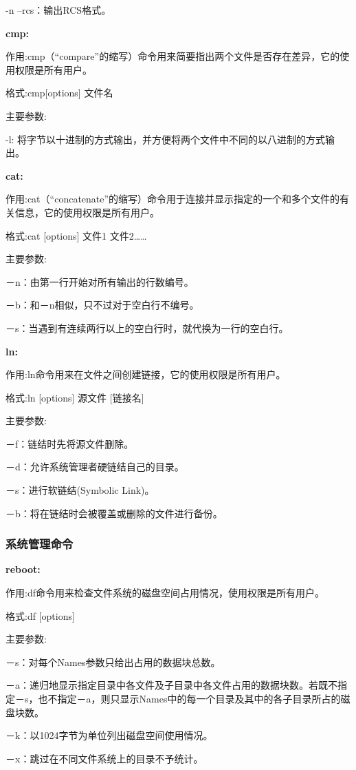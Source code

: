 -n --rcs：输出RCS格式。

\textbf{cmp:}

作用:cmp（“compare”的缩写）命令用来简要指出两个文件是否存在差异，它的使用权限是所有用户。

格式:cmp[options] 文件名

主要参数:

-l: 将字节以十进制的方式输出，并方便将两个文件中不同的以八进制的方式输出。

\textbf{cat:}

作用:cat（“concatenate”的缩写）命令用于连接并显示指定的一个和多个文件的有关信息，它的使用权限是所有用户。

格式:cat [options] 文件1 文件2……

主要参数:

－n：由第一行开始对所有输出的行数编号。

－b：和－n相似，只不过对于空白行不编号。

－s：当遇到有连续两行以上的空白行时，就代换为一行的空白行。

\textbf{ln:}

作用:ln命令用来在文件之间创建链接，它的使用权限是所有用户。

格式:ln [options] 源文件 [链接名]

主要参数:

－f：链结时先将源文件删除。

－d：允许系统管理者硬链结自己的目录。

－s：进行软链结(Symbolic Link)。

－b：将在链结时会被覆盖或删除的文件进行备份。

\subsubsection{系统管理命令}

\textbf{reboot:}

作用:df命令用来检查文件系统的磁盘空间占用情况，使用权限是所有用户。

格式:df [options]

主要参数:

－s：对每个Names参数只给出占用的数据块总数。

－a：递归地显示指定目录中各文件及子目录中各文件占用的数据块数。若既不指定－s，也不指定－a，则只显示Names中的每一个目录及其中的各子目录所占的磁盘块数。

－k：以1024字节为单位列出磁盘空间使用情况。

－x：跳过在不同文件系统上的目录不予统计。


